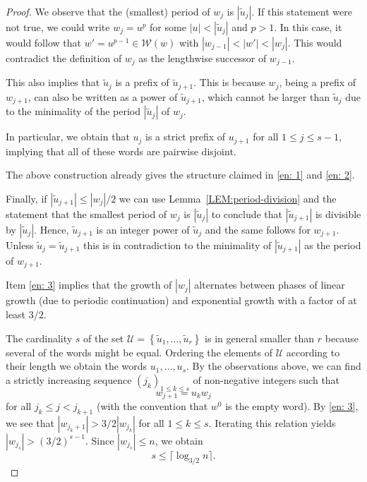 \documentclass[11pt,reqno]{amsart}
\theoremstyle{plain}
\theoremstyle{definition}
\newcommand{\mc}{\mathcal}
\begin{document}
\begin{proof}
We observe that the (smallest) period of $w_j$ is $|\tilde{u}_j|$.
If this statement were not true, we could write $w_j =  u^p$ for some $|u|< |\tilde{u}_j|$ and $p > 1$. 
In this case, it would follow that $w' = u^{p-1} \in \mc W(w)$ with $|w_{j-1}| < |w'| < |w_j|$. This would  contradict the definition of $w_j$ as the lengthwise successor of $w_{j-1}$.

This also implies that $\tilde{u}_j$ is a prefix of $\tilde{u}_{j+1}$. This is because $w_j$, being a prefix of $w_{j+1}$, can also be written as a power of $\tilde{u}_{j+1}$, which cannot be larger than $\tilde{u}_j$ due to the minimality of the period $|\tilde{u}_j|$ of $w_j$.

In particular, we obtain that $u_j$ is a strict prefix of $u_{j+1}$ for all $1 \leqslant j \leqslant s-1$, implying that all of these words are pairwise disjoint.

The above construction already gives the structure claimed in \eqref{en: 1} and \eqref{en: 2}. 


Finally, if $|\tilde{u}_{j+1}| \leqslant |w_j|/2$ we can use Lemma~\ref{LEM:period-division} and the statement that the smallest period of $w_j$ is $|\tilde{u}_j|$ to conclude that $|\tilde{u}_{j+1}|$ is divisible by $|\tilde{u}_j|$. Hence, $\tilde{u}_{j+1}$ is an integer power of $\tilde{u}_j$ and the same follows for $w_{j+1}$. Unless $\tilde{u}_j = \tilde{u}_{j+1}$ this is in contradiction to the minimality of $|\tilde{u}_{j+1}|$ as the period of $w_{j+1}$. 

Item \eqref{en: 3} implies that the growth of $|w_j|$ alternates between phases of linear growth (due to periodic continuation) and exponential growth with a factor of at least $3/2$. 

The cardinality $s$ of the set $\mc U = \left\{ \tilde{u}_1, \ldots, \tilde{u}_r \right\}$ is in general smaller than $r$ because several of the words might be equal. Ordering the elements of $\mc U$ according to their length we obtain the words $u_1, \ldots, u_s$. By the observations above, we can find a strictly increasing sequence $(j_k)_{1\leqslant k \leqslant s}$ of non-negative integers such that 
\[
w_{j+1} = u_k w_j
\]
for all $j_k \leqslant j < j_{k+1}$ (with the convention that $w^0$ is the empty word). By \eqref{en: 3}, we see that $|w_{j_{k}+1}| > 3/2 |w_{j_k}|$ for all $1\leqslant k \leqslant s$. Iterating this relation yields
$
|w_{j_s}| > (3/2)^{s-1}.
$
Since $|w_{j_s}| \leqslant n$, we obtain
\begin{equation*}
s \leqslant \lceil \log_{3/2} n \rceil.
\end{equation*}
\end{proof}
\end{document}
